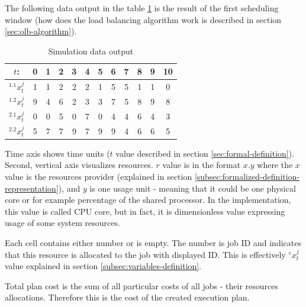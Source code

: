 The following data output in the table \ref{table:execution-plan} is the result of the first scheduling window 
(how does the load balancing algorithm work is described in section \ref{sec:olb-algorithm}).

\begin{table}[ht]
	\centering
	\caption{Simulation data output}
	\begin{tabular}{|c|c c c c c c c c c c c|} 
		\hline
		$t$:              & 0 & 1 & 2 & 3 & 4 & 5 & 6 & 7 & 8 & 9 & 10 \\
		\hline\hline
		$^{1.1}x_{t}^{j}$ & 1 & 1 & 2 & 2 & 2 & 1 & 5 & 5 & 1 & 1 & 0  \\
		$^{1.2}x_{t}^{j}$ & 9 & 4 & 6 & 2 & 3 & 3 & 7 & 5 & 8 & 9 & 8  \\
		\hline
		$^{2.1}x_{t}^{j}$ & 0 & 0 & 5 & 0 & 7 & 0 & 4 & 4 & 6 & 4 & 3  \\
		$^{2.2}x_{t}^{j}$ & 5 & 7 & 7 & 9 & 7 & 9 & 9 & 4 & 6 & 6 & 5  \\
		\hline
	\end{tabular}
	\label{table:execution-plan}
\end{table}

Time axis shows time units ($t$ value described in section \ref{sec:formal-definition}).
Second, vertical axis visualizes resources.
$r$ value is in the format $x.y$ where the $x$ value is the resources provider (explained in section \ref{subsec:formalized-definition-representation}),
and $y$ is one usage unit - meaning that it could be one physical core or for example percentage of the shared processor.
In the implementation, this value is called CPU core,
but in fact, it is dimensionless value expressing usage of some system resources.

Each cell contains either number or is empty.
The number is job ID and indicates that this resource is allocated to the job with displayed ID.
This is effectively $^{r}x_{t}^{j}$ value explained in section \ref{subsec:variables-definition}.

Total plan cost is the sum of all particular costs of all jobs - their resources allocations.
Therefore this is the cost of the created execution plan.